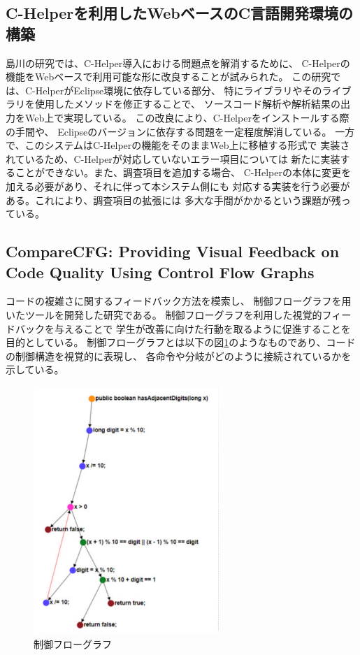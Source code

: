 \documentclass{cssspaper}
\begin{document}
            \subsection{C-Helperを利用したWebベースのC言語開発環境の構築}
            島川の研究では、C-Helper導入における問題点を解消するために、
            C-Helperの機能をWebベースで利用可能な形に改良することが試みられた。
            この研究では、C-HelperがEclipse環境に依存している部分、
            特にライブラリやそのライブラリを使用したメソッドを修正することで、
            ソースコード解析や解析結果の出力をWeb上で実現している。
            この改良により、C-Helperをインストールする際の手間や、
            Eclipseのバージョンに依存する問題を一定程度解消している。
            一方で、このシステムはC-Helperの機能をそのままWeb上に移植する形式で
            実装されているため、C-Helperが対応していないエラー項目については
            新たに実装することができない。また、調査項目を追加する場合、
            C-Helperの本体に変更を加える必要があり、それに伴って本システム側にも
            対応する実装を行う必要がある。これにより、調査項目の拡張には
            多大な手間がかかるという課題が残っている。

            \subsection{CompareCFG: Providing Visual Feedback on Code Quality Using Control Flow Graphs}
            コードの複雑さに関するフィードバック方法を模索し、
            制御フローグラフを用いたツールを開発した研究である。
            制御フローグラフを利用した視覚的フィードバックを与えることで
            学生が改善に向けた行動を取るように促進することを目的としている。
            制御フローグラフとは以下の図\ref{fig:flow}のようなものであり、コードの制御構造を視覚的に表現し、
            各命令や分岐がどのように接続されているかを示している。
            \begin{figure}[h]
                \centering
                \includegraphics[width=7cm]{flow.png}
                \caption{制御フローグラフ}
                \label{fig:flow}
            \end{figure}
\end{document}

